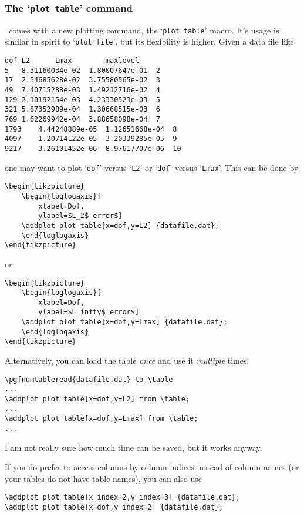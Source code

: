 \subsubsection{The `\texttt{plot table}' command}
\PGFPlots\ comes with a new plotting command, the `\texttt{plot table}' macro. It's usage is similar in spirit to `\texttt{plot file}', but its flexibility is higher. Given a data file like
\begin{lstlisting}[tabsize=8]
dof	L2		Lmax		maxlevel
5	8.31160034e-02	1.80007647e-01	2
17	2.54685628e-02	3.75580565e-02	3
49	7.40715288e-03	1.49212716e-02	4
129	2.10192154e-03	4.23330523e-03	5
321	5.87352989e-04	1.30668515e-03	6
769	1.62269942e-04	3.88658098e-04	7
1793	4.44248889e-05	1.12651668e-04	8
4097	1.20714122e-05	3.20339285e-05	9
9217	3.26101452e-06	8.97617707e-06	10
\end{lstlisting}
one may want to plot `\texttt{dof}' versus `\texttt{L2}' or `\texttt{dof}' versus `\texttt{Lmax}'. This can be done by
\begin{lstlisting}
\begin{tikzpicture}
	\begin{loglogaxis}[
		xlabel=Dof,
		ylabel=$L_2$ error$]
	\addplot plot table[x=dof,y=L2] {datafile.dat};
	\end{loglogaxis}
\end{tikzpicture}
\end{lstlisting}
or
\begin{lstlisting}
\begin{tikzpicture}
	\begin{loglogaxis}[
		xlabel=Dof,
		ylabel=$L_infty$ error$]
	\addplot plot table[x=dof,y=Lmax] {datafile.dat};
	\end{loglogaxis}
\end{tikzpicture}
\end{lstlisting}
Alternatively, you can load the table \emph{once} and use it \emph{multiple} times:
\begin{lstlisting}
\pgfnumtableread{datafile.dat} to \table
...
\addplot plot table[x=dof,y=L2] from \table;
...
\addplot plot table[x=dof,y=Lmax] from \table;
...
\end{lstlisting}
I am not really sure how much time can be saved, but it works anyway.

If you do prefer to access columns by column indices instead of column names (or your tables do not have table names), you can also use
\begin{lstlisting}
\addplot plot table[x index=2,y index=3] {datafile.dat};
\addplot plot table[x=dof,y index=2] {datafile.dat};
\end{lstlisting}

